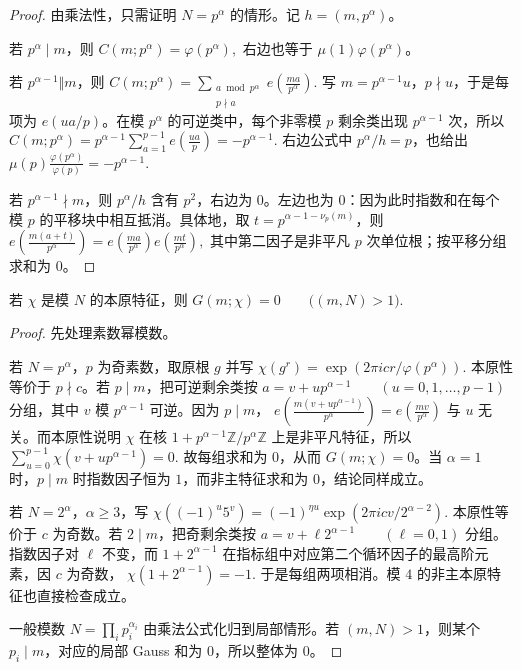 \documentclass[oneside]{AJbook}
\newcommand{\Z}{\mathbb Z}
\newcommand{\expi}[1]{\exp(2\pi i #1)}
\begin{document}
\begin{proof}
由乘法性，只需证明 $N=p^\alpha$ 的情形。记 $h=(m,p^\alpha)$。

若 $p^\alpha\mid m$，则
\(
  C(m;p^\alpha)=\varphi(p^\alpha),
\)
右边也等于 $\mu(1)\varphi(p^\alpha)$。

若 $p^{\alpha-1}\Vert m$，则
\(
  C(m;p^\alpha)
  =
  \sum_{\substack{a\bmod p^\alpha\\p\nmid a}}
  e\!\left(\frac{ma}{p^\alpha}\right).
\)
写 $m=p^{\alpha-1}u$，$p\nmid u$，于是每项为 $e(ua/p)$。在模 $p^\alpha$ 的可逆类中，每个非零模 $p$ 剩余类出现
$p^{\alpha-1}$ 次，所以
\(
  C(m;p^\alpha)
  =
  p^{\alpha-1}\sum_{a=1}^{p-1}e\!\left(\frac{ua}{p}\right)
  =
  -p^{\alpha-1}.
\)
右边公式中 $p^\alpha/h=p$，也给出
\(
  \mu(p)\frac{\varphi(p^\alpha)}{\varphi(p)}
  =
  -p^{\alpha-1}.
\)

若 $p^{\alpha-1}\nmid m$，则 $p^\alpha/h$ 含有 $p^2$，右边为 $0$。左边也为 $0$：因为此时指数和在每个模 $p$ 的平移块中相互抵消。具体地，取 $t=p^{\alpha-1-\nu_p(m)}$，则
\(
  e\!\left(\frac{m(a+t)}{p^\alpha}\right)
  =
  e\!\left(\frac{ma}{p^\alpha}\right)
  e\!\left(\frac{mt}{p^\alpha}\right),
\)
其中第二因子是非平凡 $p$ 次单位根；按平移分组求和为 $0$。
\end{proof}

\begin{theorem}[本原特征的消失性]
若 $\chi$ 是模 $N$ 的本原特征，则
\(
  G(m;\chi)=0\qquad\bigl((m,N)>1\bigr).
\)
\end{theorem}

\begin{proof}
先处理素数幂模数。

若 $N=p^\alpha$，$p$ 为奇素数，取原根 $g$ 并写
\(
  \chi(g^r)=\expi{cr/\varphi(p^\alpha)}.
\)
本原性等价于 $p\nmid c$。若 $p\mid m$，把可逆剩余类按
\(
  a=v+up^{\alpha-1}\qquad(u=0,1,\ldots,p-1)
\)
分组，其中 $v$ 模 $p^{\alpha-1}$ 可逆。因为 $p\mid m$，
\(
  e\!\left(\frac{m(v+up^{\alpha-1})}{p^\alpha}\right)
  =
  e\!\left(\frac{mv}{p^\alpha}\right)
\)
与 $u$ 无关。而本原性说明 $\chi$ 在核
\(
  1+p^{\alpha-1}\Z/p^\alpha\Z
\)
上是非平凡特征，所以
\(
  \sum_{u=0}^{p-1}\chi(v+up^{\alpha-1})=0.
\)
故每组求和为 $0$，从而 $G(m;\chi)=0$。当 $\alpha=1$ 时，$p\mid m$ 时指数因子恒为 $1$，而非主特征求和为 $0$，结论同样成立。

若 $N=2^\alpha$，$\alpha\ge3$，写
\(
  \chi((-1)^u5^v)=(-1)^{\eta u}\expi{cv/2^{\alpha-2}}.
\)
本原性等价于 $c$ 为奇数。若 $2\mid m$，把奇剩余类按
\(
  a=v+\ell 2^{\alpha-1}\qquad(\ell=0,1)
\)
分组。指数因子对 $\ell$ 不变，而
\(
  1+2^{\alpha-1}
\)
在指标组中对应第二个循环因子的最高阶元素，因 $c$ 为奇数，
\(
  \chi(1+2^{\alpha-1})=-1.
\)
于是每组两项相消。模 $4$ 的非主本原特征也直接检查成立。

一般模数
\(
  N=\prod_i p_i^{\alpha_i}
\)
由乘法公式化归到局部情形。若 $(m,N)>1$，则某个 $p_i\mid m$，对应的局部 Gauss 和为 $0$，所以整体为 $0$。
\end{proof}
\end{document}
